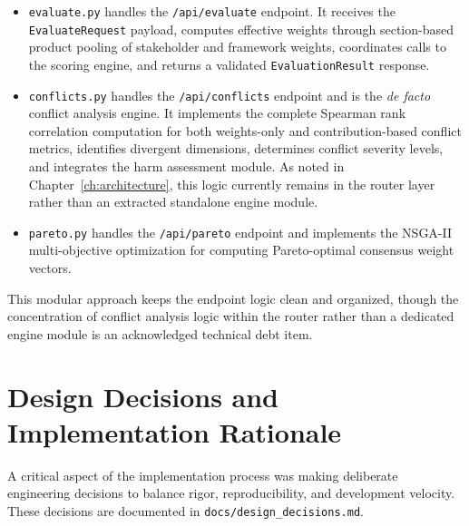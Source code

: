 \begin{itemize}[leftmargin=2em]
  \item \begin{sloppypar}\texttt{evaluate.py} handles the \texttt{/api/evaluate} endpoint. It receives the \texttt{EvaluateRequest} payload, computes effective weights through section-based product pooling of stakeholder and framework weights, coordinates calls to the scoring engine, and returns a validated \texttt{EvaluationResult} response.\end{sloppypar}

  \item \texttt{conflicts.py} handles the \texttt{/api/conflicts} endpoint and is the \emph{de facto} conflict analysis engine. It implements the complete Spearman rank correlation computation for both weights-only and contribution-based conflict metrics, identifies divergent dimensions, determines conflict severity levels, and integrates the harm assessment module. As noted in Chapter~\ref{ch:architecture}, this logic currently remains in the router layer rather than an extracted standalone engine module.

  \item \texttt{pareto.py} handles the \texttt{/api/pareto} endpoint and implements the NSGA-II multi-objective optimization for computing Pareto-optimal consensus weight vectors.
\end{itemize}

This modular approach keeps the endpoint logic clean and organized, though the concentration of conflict analysis logic within the router rather than a dedicated engine module is an acknowledged technical debt item.

\section{Design Decisions and Implementation Rationale}
\label{sec:decisions}

A critical aspect of the implementation process was making deliberate engineering decisions to balance rigor, reproducibility, and development velocity. These decisions are documented in \texttt{docs/design\_decisions.md}.

